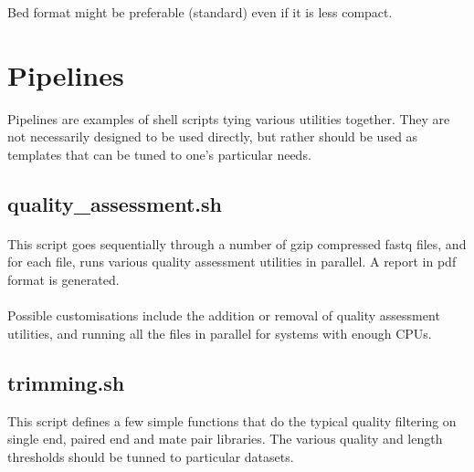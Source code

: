 \documentclass[a4paper,12pt]{article}
\begin{document}
Bed format might be preferable (standard) even if it is less compact.


\section{Pipelines}

\label{pipelines}

Pipelines are examples of shell scripts tying various utilities together.
They are not necessarily designed to be used directly, but rather should be
used as templates that can be tuned to one's particular needs.


\subsection{quality\_assessment.sh}

\paragraph{}
This script goes sequentially through a number of gzip compressed fastq files,
and for each file, runs various quality assessment utilities in parallel.
A report in pdf format is generated.

\paragraph{}
Possible customisations include the addition or removal of quality assessment
utilities, and running all the files in parallel for systems with enough CPUs.


\subsection{trimming.sh}

This script defines a few simple functions that do the typical quality
filtering on single end, paired end and mate pair libraries.
The various quality and length thresholds should be tunned to particular
datasets.
\end{document}
